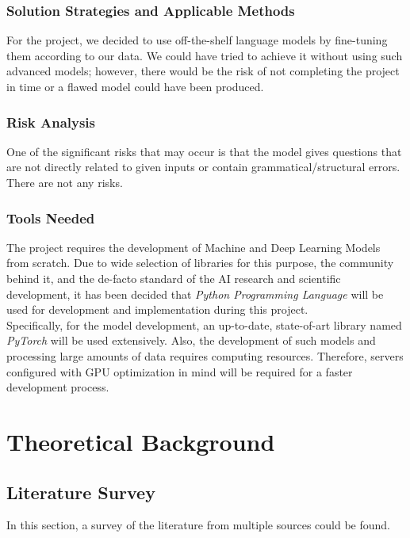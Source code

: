 \documentclass{mefsdp}
\begin{document}
	
	\subsubsection{Solution Strategies and Applicable Methods}
	For the project, we decided to use off-the-shelf language models by fine-tuning them according to our data. We could have tried to achieve it without using such advanced models; however, there would be the risk of not completing the project in time or a flawed model could have been produced.
	
	\subsubsection{Risk Analysis}
	One of the significant risks that may occur is that the model gives questions that are not directly related to given inputs or contain grammatical/structural errors. There are not any risks.
	
	\subsubsection{Tools Needed}
	The project requires the development of Machine and Deep Learning Models from scratch. Due to wide selection of libraries for this purpose, the community behind it, and the de-facto standard of the AI research and scientific development, it has been decided that \textit{Python Programming Language} will be used for development and implementation during this project.\\
	
	Specifically, for the model development, an up-to-date, state-of-art library named \textit{PyTorch} will be used extensively. Also, the development of such models and processing large amounts of data requires computing resources. Therefore, servers configured with GPU optimization in mind will be required for a faster development process.
	
	
	
	\section{Theoretical Background}
	\subsection{Literature Survey}
	In this section, a survey of the literature from multiple sources could be found.
\end{document}
